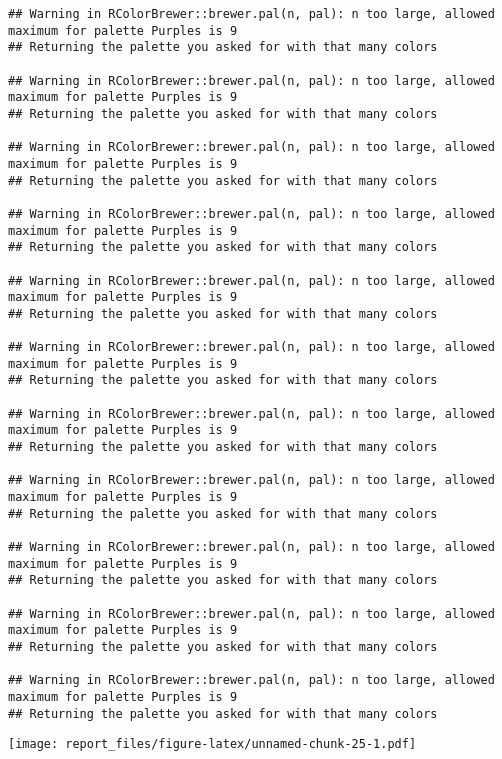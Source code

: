 \documentclass[
]{article}
\begin{document}
\begin{verbatim}
## Warning in RColorBrewer::brewer.pal(n, pal): n too large, allowed maximum for palette Purples is 9
## Returning the palette you asked for with that many colors

## Warning in RColorBrewer::brewer.pal(n, pal): n too large, allowed maximum for palette Purples is 9
## Returning the palette you asked for with that many colors

## Warning in RColorBrewer::brewer.pal(n, pal): n too large, allowed maximum for palette Purples is 9
## Returning the palette you asked for with that many colors

## Warning in RColorBrewer::brewer.pal(n, pal): n too large, allowed maximum for palette Purples is 9
## Returning the palette you asked for with that many colors

## Warning in RColorBrewer::brewer.pal(n, pal): n too large, allowed maximum for palette Purples is 9
## Returning the palette you asked for with that many colors

## Warning in RColorBrewer::brewer.pal(n, pal): n too large, allowed maximum for palette Purples is 9
## Returning the palette you asked for with that many colors

## Warning in RColorBrewer::brewer.pal(n, pal): n too large, allowed maximum for palette Purples is 9
## Returning the palette you asked for with that many colors

## Warning in RColorBrewer::brewer.pal(n, pal): n too large, allowed maximum for palette Purples is 9
## Returning the palette you asked for with that many colors

## Warning in RColorBrewer::brewer.pal(n, pal): n too large, allowed maximum for palette Purples is 9
## Returning the palette you asked for with that many colors

## Warning in RColorBrewer::brewer.pal(n, pal): n too large, allowed maximum for palette Purples is 9
## Returning the palette you asked for with that many colors

## Warning in RColorBrewer::brewer.pal(n, pal): n too large, allowed maximum for palette Purples is 9
## Returning the palette you asked for with that many colors
\end{verbatim}

\texttt{[image: report\_files/figure-latex/unnamed-chunk-25-1.pdf]}
\end{document}
